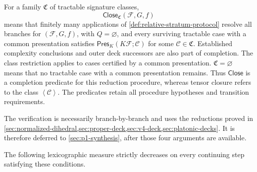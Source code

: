 \documentclass[11pt,letterpaper,onecolumn]{article}
\theoremstyle{plain}
\theoremstyle{definition}
\theoremstyle{remark}
\newcommand{\cF}{\mathcal F}
\newcommand{\cC}{\mathscr C}
\newcommand{\angles}[1]{\left\langle #1\right\rangle}
\newcommand{\PresK}{\mathsf{Pres}_{K}}
\newcommand{\Close}{\mathsf{Close}}
\begin{document}
For a family \(\mathfrak C\) of tractable signature classes,
\begin{equation}
 \Close_{\mathfrak C}(\cF,G,f)
 \label{eq:relative-close-predicate}
\end{equation}
means that finitely many applications of \cref{def:relative-stratum-protocol}
resolve all branches for \((\cF,G,f)\), with \(Q=\varnothing\), and every surviving
tractable case with a common presentation satisfies
\(\PresK(K\cF;\cC)\) for some \(\cC\in\mathfrak C\).
Established complexity conclusions and outer deck successors are also
part of completion. The class restriction applies to cases certified by
a common presentation.
\(\mathfrak C=\varnothing\) means that no tractable case with a common presentation
remains.  Thus \(\Close\) is a completion predicate for this reduction procedure,
whereas tensor closure refers to the class \(\angles{\cC}\).  The predicates
retain all procedure hypotheses and transition requirements.

The verification is necessarily branch-by-branch and uses the reductions
proved in
\cref{sec:normalized-dihedral,sec:proper-deck,sec:v4-deck,sec:platonic-decks}.
It is therefore deferred to \cref{sec:p1-synthesis}, after those four
arguments are available.

The following lexicographic measure strictly decreases on every continuing
step satisfying these conditions.
\end{document}
